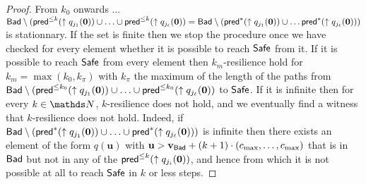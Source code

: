 \begin{proof}
From $k_0$ onwards ...
$\textsf{Bad} \setminus (\textsf{pred}^{\leq k}(\uparrow q_{j_1}(\textbf{0}))\cup \ldots \cup \textsf{pred}^{\leq k}(\uparrow q_{j_\ell}(\textbf{0}))= 
\textsf{Bad} \setminus (\textsf{pred}^{*}(\uparrow q_{j_1}(\textbf{0})) \cup \ldots \textsf{pred}^{*}(\uparrow q_{j_\ell}(\textbf{0})) )$
is stationnary. 
If the set is finite then we stop the procedure once we have checked for every element
whether it is possible to reach $\textsf{Safe}$ from it.
If it is possible to reach $\textsf{Safe}$ from every element then {\sc $k_m$-resilience}
hold
for $k_m = \max(k_0, k_{\pi})$ with 
$k_{\pi}$ the maximum of the length of the paths from 
$\textsf{Bad} \setminus (\textsf{pred}^{\leq k_0}(\uparrow q_{j_1}(\textbf{0}))\cup \ldots \cup \textsf{pred}^{\leq k_0}(\uparrow q_{j_\ell}(\textbf{0}))$ to $\textsf{Safe}$.
If it is infinite then
for every $k \in \N$,
$k$-resilience does not hold, 
and we eventually find a witness that $k$-resilience does not hold.
Indeed, 
if
$\textsf{Bad} \setminus (\textsf{pred}^{*}(\uparrow q_{j_1}(\textbf{0})) \cup \ldots \cup \textsf{pred}^{*}(\uparrow q_{j_\ell}(\textbf{0})) )$
is
infinite
then
there exists an element of the form $q(\textbf{u} )$
with $\textbf{u} > \textbf{v}_{\textsf{Bad}} + (k+1) \cdot (c_{\max}, \ldots, c_{\max})$ 
that is in $\textsf{Bad}$ but not in any of the $\textsf{pred}^{\leq k}(\uparrow q_{j_i}(\textbf{0}))$,
and hence from which it is not possible at all to reach
$\textsf{Safe}$ in $k$ or less steps.
\end{proof}





